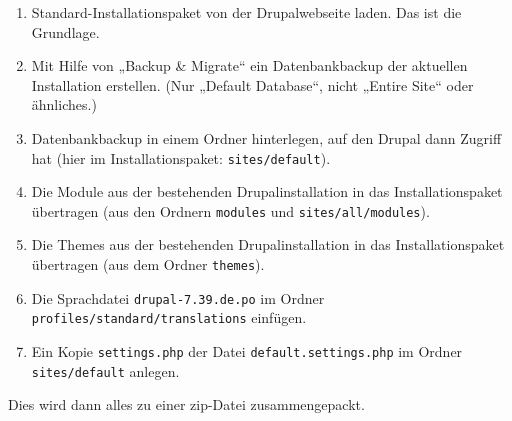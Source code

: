 \documentclass[a4paper,11pt,twoside]{article}
\begin{document}
\begin{enumerate}\itemsep0pt
\item Standard-Installationspaket von der Drupalwebseite laden. Das ist die
  Grundlage.
\item Mit Hilfe von „Backup \& Migrate“ ein Datenbankbackup der aktuellen
  Installation erstellen. (Nur „Default Database“, nicht „Entire Site“ oder
  ähnliches.)
\item Datenbankbackup in einem Ordner hinterlegen, auf den Drupal dann Zugriff
  hat (hier im Installationspaket: \texttt{sites/default}).
\item Die Module aus der bestehenden Drupalinstallation in das
  Installationspaket übertragen (aus den Ordnern \texttt{modules} und
  \texttt{sites/all/modules}).
\item Die Themes aus der bestehenden Drupalinstallation in das
  Installationspaket übertragen (aus dem Ordner \texttt{themes}).
\item Die Sprachdatei \texttt{drupal-7.39.de.po} im Ordner
  \texttt{profiles/standard/translations} einfügen.
\item Ein Kopie \texttt{settings.php} der Datei \texttt{default.settings.php}
  im Ordner \texttt{sites/default} anlegen.
\end{enumerate}
Dies wird dann alles zu einer zip-Datei zusammengepackt.
\end{document}
